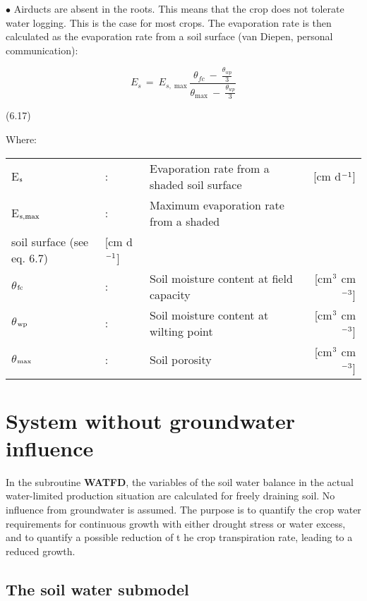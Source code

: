  
$\bullet$ Airducts are absent in the roots. This means that the crop does not tolerate water
logging. This is the case for most crops. The evaporation rate is then calculated as the
evaporation rate from a soil surface (van Diepen, personal communication):  

\begin{equation}
E _{s~} =~ E _{s,\max } {\frac{ \theta  _{fc} ~-~ {{\frac{\theta  _{wp} }{3}}} }{\theta  _{\max } ~-~{{\frac{\theta  _{wp} }{3}}} }}
\end{equation}


\strut\hfill (6.17)



Where:\\
\begin{tabularx}{\textwidth}{llXr}



 E$_{{\rm s}}$ &:& Evaporation rate from a shaded soil surface & [cm d$^{{\rm -1}}$]\\
 E$_{{\rm s,max}}$ &:& Maximum evaporation rate from a shaded \\
    soil surface (see eq. 6.7) & [cm d$^{{\rm -1}}$]\\
 $\theta$$_{{\rm fc}}$ &:& Soil moisture content at field capacity & [cm$^{{\rm 3}}$ cm$^{{\rm -3}}$]\\
 $\theta$$_{{\rm wp}}$ &:& Soil moisture content at wilting point & [cm$^{{\rm 3}}$ cm$^{{\rm -3}}$]\\
 $\theta$$_{{\rm max}}$ &:& Soil porosity & [cm$^{{\rm 3}}$ cm$^{{\rm -3}}$]
\end{tabularx}
\newpage

\section{System without groundwater influence  }

In the subroutine {\bf WATFD}, the variables of the soil water balance in the actual water-limited produc\-tion situation are calculated for freely draining soil. No influence from
groundwater is assumed. The purpose is to quantify the crop water requirements for
continuous growth with either drought stress or water excess, and to quantify a possible
reduction of t  he crop transpiration rate, leading to a reduced growth.




\subsection{The soil water submodel  }

